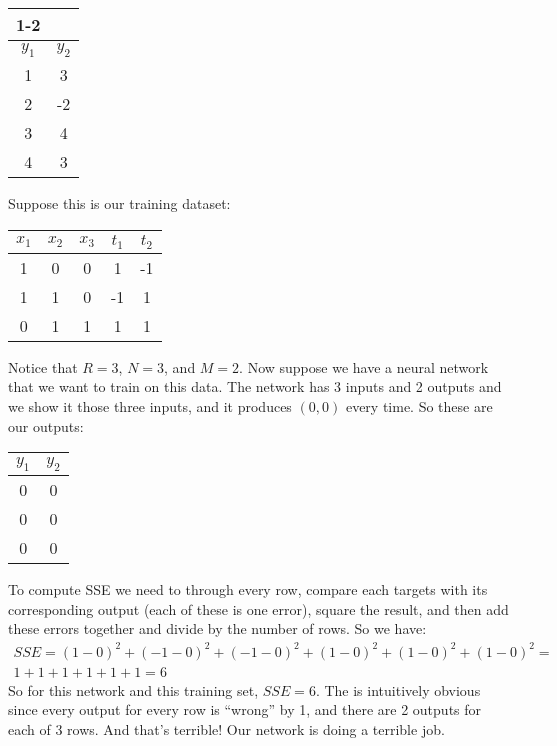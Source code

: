 \documentclass[11pt]{amsart}
\begin{document}
\bigskip
\bigskip


\begin{center}
\begin{tabular}{| c | c | }
\cline{1-2}
\multicolumn{2}{| c | }{outputs}\\
\hline
  $y_1$  & $y_2$  \\
\hline
  1 & 3  \\
\hline
 2 & -2  \\
\hline
 3 & 4 \\
\hline
 4 & 3 \\
\hline
\end{tabular}
\end{center}

\bigskip
\bigskip

Suppose this is our training dataset:

\begin{center}
\begin{tabular}{| c | c | c || c | c | }
\hline
  $x_1$ & $x_2$  & $x_3$  & $t_1$  & $t_2$  \\
\hline
  1  & 0  & 0  & 1  & -1  \\
\hline
  1  & 1 & 0  & -1  & 1  \\
\hline
  0  & 1  &1  & 1  & 1  \\
\hline
\end{tabular}
\end{center}
Notice that $R = 3$, $N=3$, and $M=2$. Now suppose we have a neural network that we want to train on this data. The network has 3 inputs and 2 outputs and we show it those three inputs, and it produces $(0,0)$ every time. So these are our outputs:

\begin{center}
\begin{tabular}{| c | c | }
\hline
  $y_1$ & $y_2$ \\
\hline
  0  & 0  \\
\hline
  0  & 0  \\
\hline
  0  & 0 \\
\hline
\end{tabular}
\end{center}

To compute SSE we need to through every row, compare each targets with its corresponding output (each of these is one error), square the result, and then add these errors together and divide by the number of rows. So we have:
\begin{eqnarray*}
SSE =  (1-0)^2 + (- 1-0)^2 + (-1-0)^2 + (1- 0)^2 + (1-0)^2 + (1 - 0)^2 =  \\ 
1 + 1 + 1 + 1 + 1 + 1 = 6
\end{eqnarray*}
So for this network and this training set, $SSE = 6$. The is intuitively obvious since every output for every row is ``wrong'' by 1, and there are 2 outputs for each of 3 rows. And that's terrible!  Our network is doing a terrible job. 
\end{document}
